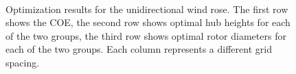 \documentclass[conf]{new-aiaa}
\begin{document}
\begin{figure}[htbp]
\begin{centering}
    \hspace{-0.35cm}
    \hspace{-0.35cm}
    \hspace{-0.35cm}
    \\
    \vspace{-0.25cm}
    \caption{Optimization results for the unidirectional wind rose. The first row shows the COE, the second row shows optimal hub heights for each of the two groups, the third row shows optimal rotor diameters for each of the two groups. Each column represents a different grid spacing.}
  \label{unidirectional}
  \end{centering}
\end{figure}
    
\end{document}
